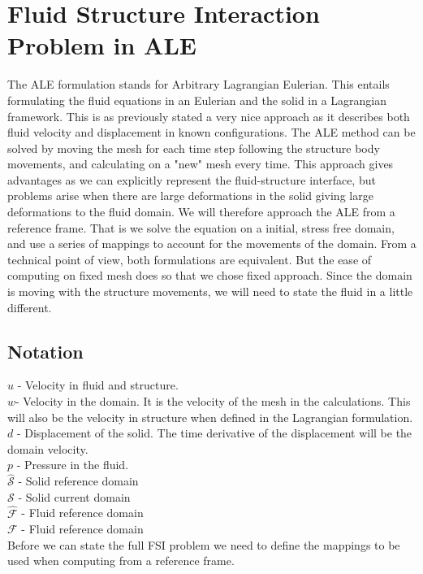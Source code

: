 

\section*{Fluid Structure Interaction Problem in ALE}
The ALE formulation stands for Arbitrary Lagrangian Eulerian. This entails formulating the fluid equations in an Eulerian and the solid in a Lagrangian framework. This is as previously stated a very nice approach as it describes both fluid velocity and displacement in known configurations. The ALE method can be solved by moving the mesh for each time step following the structure body movements, and calculating on a "new" mesh every time. This approach gives advantages as we can explicitly represent the fluid-structure interface, but problems arise when there are large deformations in the solid giving large deformations to the fluid domain. We will therefore approach the ALE from a reference frame. That is we solve the equation on a initial, stress free domain, and use a series of mappings to account for the movements of the domain. From a technical point of view, both formulations are equivalent. But the ease of computing on fixed mesh does so that we chose fixed approach. \newline
Since the domain is moving with the structure movements, we will need to state the fluid in a little different.        

\subsection*{Notation}
$u$ - Velocity in fluid and structure. \\
$w$- Velocity in the domain. It is the velocity of the mesh in the calculations. This will also be the velocity in structure when defined in the Lagrangian formulation. \\
$d$ - Displacement of the solid. The time derivative of the displacement will be the domain velocity. \\
$p$ - Pressure in the fluid. \\
$\hat{\mathcal{S}}$ - Solid reference domain  \\
$\mathcal{S}$ - Solid current domain  \\
$ \hat{\mathcal{F}}$ - Fluid reference domain \\
$ \mathcal{F} $ - Fluid reference domain \\

Before we can state the full FSI problem we need to define the mappings to be used when computing from a reference frame.
